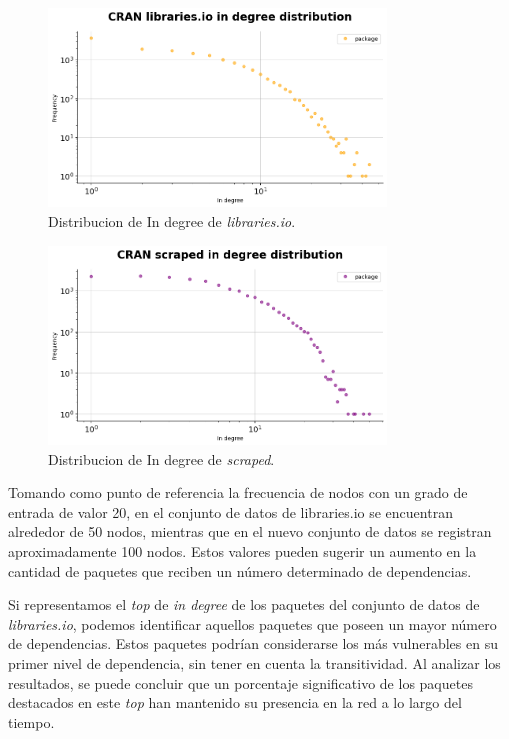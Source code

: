 \begin{figure}[h!]
    \begin{center}
        \includegraphics[width=0.8\textwidth]{img/cran/ind_lib.png}
        \caption{Distribucion de In degree de \textit{libraries.io}.}
        \label{fig:cran_in_lib}
    \end{center}
\end{figure}

\begin{figure}[h!]
    \begin{center}
        \includegraphics[width=0.8\textwidth]{img/cran/ind_scr.png}
        \caption{Distribucion de In degree de \textit{scraped}.}
        \label{fig:cran_in_scraped}
    \end{center}
\end{figure}

Tomando como punto de referencia la frecuencia de nodos con un grado de entrada de valor 20,
en el conjunto de datos de libraries.io se encuentran alrededor de 50 nodos, mientras que en
el nuevo conjunto de datos se registran aproximadamente 100 nodos. Estos valores pueden sugerir
un aumento en la cantidad de paquetes que reciben un número determinado de dependencias.


Si representamos el \textit{top} de \textit{in degree} de los paquetes del conjunto de datos
de \textit{libraries.io}, podemos identificar aquellos paquetes que poseen un mayor número de
dependencias. Estos paquetes podrían considerarse los más vulnerables en su primer nivel de dependencia,
sin tener en cuenta la transitividad. Al analizar los resultados, se puede concluir que un porcentaje
significativo de los paquetes destacados en este \textit{top} han mantenido su presencia en la red a
lo largo del tiempo.

